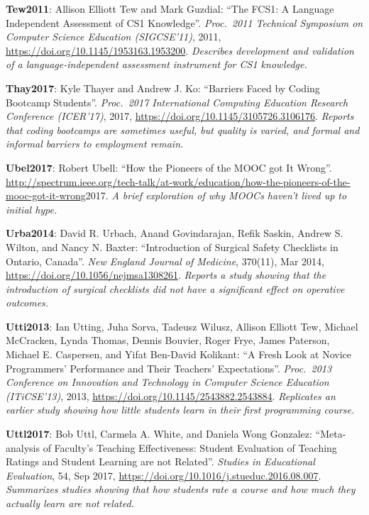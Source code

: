 \textbf{\hypertarget{b:Tew2011}{Tew2011}\label{b:Tew2011}}: Allison Elliott Tew and Mark Guzdial: ``The FCS1: A Language Independent Assessment of CS1 Knowledge''. \emph{Proc.\ 2011 Technical Symposium on Computer Science Education (SIGCSE'11)}, 2011, \url{https://doi.org/10.1145/1953163.1953200}. \emph{Describes development and validation of a language-independent assessment instrument for CS1 knowledge.}

\textbf{\hypertarget{b:Thay2017}{Thay2017}\label{b:Thay2017}}: Kyle Thayer and Andrew J. Ko: ``Barriers Faced by Coding Bootcamp Students''. \emph{Proc.\ 2017 International Computing Education Research Conference (ICER'17)}, 2017, \url{https://doi.org/10.1145/3105726.3106176}. \emph{Reports that coding bootcamps are sometimes useful, but quality is varied, and formal and informal barriers to employment remain.}

\textbf{\hypertarget{b:Ubel2017}{Ubel2017}\label{b:Ubel2017}}: Robert Ubell: ``How the Pioneers of the MOOC got It Wrong''. \url{http://spectrum.ieee.org/tech-talk/at-work/education/how-the-pioneers-of-the-mooc-got-it-wrong}2017. \emph{A brief exploration of why MOOCs haven't lived up to initial hype.}

\textbf{\hypertarget{b:Urba2014}{Urba2014}\label{b:Urba2014}}: David R. Urbach, Anand Govindarajan, Refik Saskin, Andrew S. Wilton, and Nancy N. Baxter: ``Introduction of Surgical Safety Checklists in Ontario, Canada''. \emph{New England Journal of Medicine}, 370(11), Mar 2014, \url{https://doi.org/10.1056/nejmsa1308261}. \emph{Reports a study showing that the introduction of surgical checklists did not have a significant effect on operative outcomes.}

\textbf{\hypertarget{b:Utti2013}{Utti2013}\label{b:Utti2013}}: Ian Utting, Juha Sorva, Tadeusz Wilusz, Allison Elliott Tew, Michael McCracken, Lynda Thomas, Dennis Bouvier, Roger Frye, James Paterson, Michael E. Caspersen, and Yifat Ben-David Kolikant: ``A Fresh Look at Novice Programmers' Performance and Their Teachers' Expectations''. \emph{Proc.\ 2013 Conference on Innovation and Technology in Computer Science Education (ITiCSE'13)}, 2013, \url{https://doi.org/10.1145/2543882.2543884}. \emph{Replicates an earlier study showing how little students learn in their first programming course.}

\textbf{\hypertarget{b:Uttl2017}{Uttl2017}\label{b:Uttl2017}}: Bob Uttl, Carmela A. White, and Daniela Wong Gonzalez: ``Meta-analysis of Faculty's Teaching Effectiveness: Student Evaluation of Teaching Ratings and Student Learning are not Related''. \emph{Studies in Educational Evaluation}, 54, Sep 2017, \url{https://doi.org/10.1016/j.stueduc.2016.08.007}. \emph{Summarizes studies showing that how students rate a course and how much they actually learn are not related.}

